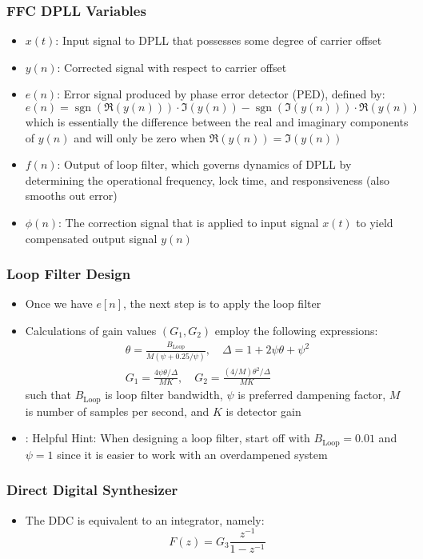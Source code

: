 \documentclass[10pt]{beamer}
\DeclareMathOperator{\sgn}{sgn}
\begin{document}

\frame
{
  \frametitle{FFC DPLL Variables}
 
 \begin{itemize}
  \item $x(t)$: Input signal to DPLL that possesses some degree of carrier offset
  \item $y(n)$: Corrected signal with respect to carrier offset
  \item $e(n)$: Error signal produced by phase error detector (PED), defined by:
  \begin{equation}
   e(n)=\sgn(\Re(y(n)))\cdot\Im(y(n))-\sgn(\Im(y(n)))\cdot\Re(y(n))
  \end{equation}
  which is essentially the difference between the real and imaginary components of $y(n)$ and will only be zero when $\Re(y(n))=\Im(y(n))$
  \item $f(n)$: Output of loop filter, which governs dynamics of DPLL by determining the operational frequency, lock time, and responsiveness (also smooths out error)
  \item $\phi(n)$: The correction signal that is applied to input signal $x(t)$ to yield compensated output signal $y(n)$
 \end{itemize}

 
}


\frame
{
  \frametitle{Loop Filter Design}

  \begin{itemize}
   \item Once we have $e[n]$, the next step is to apply the loop filter
   \item Calculations of gain values $(G_1,G_2)$ employ the following expressions:
\begin{align}
 \theta=\frac{B_{\mathrm{Loop}}}{M(\psi+0.25/\psi)},\quad\Delta=1+2\psi\theta+\psi^2\\
 G_1=\frac{4\psi\theta/\Delta}{MK},\quad{G_2}=\frac{(4/M)\theta^2/\Delta}{MK}
\end{align}
such that $B_{\mathrm{Loop}}$ is loop filter bandwidth, $\psi$ is preferred dampening factor, $M$ is number of samples per second, and $K$ is detector gain
\item: Helpful Hint: When designing a loop filter, start off with $B_{\mathrm{Loop}}=0.01$ and $\psi=1$ since it is easier to work with an overdampened system
  \end{itemize}
 
}



\frame
{
  \frametitle{Direct Digital Synthesizer}

  \begin{itemize}
   \item The DDC is equivalent to an integrator, namely:
\begin{equation}
 F(z)=G_3\frac{z^{-1}}{1-z^{-1}}
\end{equation}
\end{itemize}

}
\end{document}

